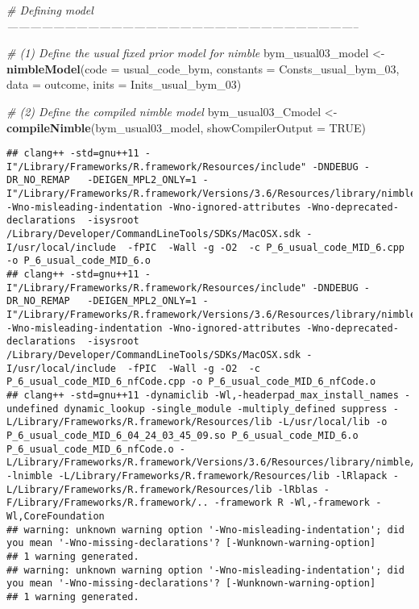 \documentclass[]{article}
\newenvironment{Shaded}{\begin{snugshade}}{\end{snugshade}}
\newcommand{\CommentTok}[1]{\textcolor[rgb]{0.56,0.35,0.01}{\textit{#1}}}
\newcommand{\DataTypeTok}[1]{\textcolor[rgb]{0.13,0.29,0.53}{#1}}
\newcommand{\DecValTok}[1]{\textcolor[rgb]{0.00,0.00,0.81}{#1}}
\newcommand{\KeywordTok}[1]{\textcolor[rgb]{0.13,0.29,0.53}{\textbf{#1}}}
\newcommand{\NormalTok}[1]{#1}
\newcommand{\OtherTok}[1]{\textcolor[rgb]{0.56,0.35,0.01}{#1}}
\newcommand{\StringTok}[1]{\textcolor[rgb]{0.31,0.60,0.02}{#1}}
\begin{document}
\begin{Shaded}
\begin{Highlighting}[]
\CommentTok{# Defining model --------------------------------------------------------------------------------------------}

\CommentTok{# (1) Define the usual fixed prior model for nimble}
\NormalTok{bym_usual03_model <-}\StringTok{ }\KeywordTok{nimbleModel}\NormalTok{(}\DataTypeTok{code =}\NormalTok{ usual_code_bym, }\DataTypeTok{constants =}\NormalTok{ Consts_usual_bym_}\DecValTok{03}\NormalTok{, }
                             \DataTypeTok{data =}\NormalTok{ outcome, }\DataTypeTok{inits =}\NormalTok{ Inits_usual_bym_}\DecValTok{03}\NormalTok{)}

\CommentTok{# (2) Define the compiled nimble model}
\NormalTok{bym_usual03_Cmodel <-}\StringTok{ }\KeywordTok{compileNimble}\NormalTok{(bym_usual03_model, }\DataTypeTok{showCompilerOutput =} \OtherTok{TRUE}\NormalTok{)      }
\end{Highlighting}
\end{Shaded}

\begin{verbatim}
## clang++ -std=gnu++11 -I"/Library/Frameworks/R.framework/Resources/include" -DNDEBUG -DR_NO_REMAP   -DEIGEN_MPL2_ONLY=1 -I"/Library/Frameworks/R.framework/Versions/3.6/Resources/library/nimble/include" -Wno-misleading-indentation -Wno-ignored-attributes -Wno-deprecated-declarations  -isysroot /Library/Developer/CommandLineTools/SDKs/MacOSX.sdk -I/usr/local/include  -fPIC  -Wall -g -O2  -c P_6_usual_code_MID_6.cpp -o P_6_usual_code_MID_6.o
## clang++ -std=gnu++11 -I"/Library/Frameworks/R.framework/Resources/include" -DNDEBUG -DR_NO_REMAP   -DEIGEN_MPL2_ONLY=1 -I"/Library/Frameworks/R.framework/Versions/3.6/Resources/library/nimble/include" -Wno-misleading-indentation -Wno-ignored-attributes -Wno-deprecated-declarations  -isysroot /Library/Developer/CommandLineTools/SDKs/MacOSX.sdk -I/usr/local/include  -fPIC  -Wall -g -O2  -c P_6_usual_code_MID_6_nfCode.cpp -o P_6_usual_code_MID_6_nfCode.o
## clang++ -std=gnu++11 -dynamiclib -Wl,-headerpad_max_install_names -undefined dynamic_lookup -single_module -multiply_defined suppress -L/Library/Frameworks/R.framework/Resources/lib -L/usr/local/lib -o P_6_usual_code_MID_6_04_24_03_45_09.so P_6_usual_code_MID_6.o P_6_usual_code_MID_6_nfCode.o -L/Library/Frameworks/R.framework/Versions/3.6/Resources/library/nimble/CppCode -lnimble -L/Library/Frameworks/R.framework/Resources/lib -lRlapack -L/Library/Frameworks/R.framework/Resources/lib -lRblas -F/Library/Frameworks/R.framework/.. -framework R -Wl,-framework -Wl,CoreFoundation
## warning: unknown warning option '-Wno-misleading-indentation'; did you mean '-Wno-missing-declarations'? [-Wunknown-warning-option]
## 1 warning generated.
## warning: unknown warning option '-Wno-misleading-indentation'; did you mean '-Wno-missing-declarations'? [-Wunknown-warning-option]
## 1 warning generated.
\end{verbatim}
\end{document}
